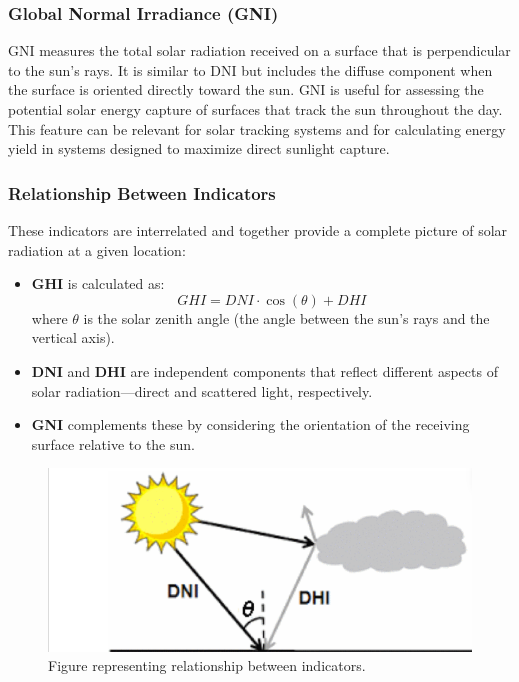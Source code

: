 \documentclass[10pt,twocolumn]{article}
\begin{document}
\subsubsection{Global Normal Irradiance (GNI)}
\begin{itemize}
     GNI measures the total solar radiation received on a surface that is perpendicular to the sun’s rays. It is similar to DNI but includes the diffuse component when the surface is oriented directly toward the sun. GNI is useful for assessing the potential solar energy capture of surfaces that track the sun throughout the day. This feature can be relevant for solar tracking systems and for calculating energy yield in systems designed to maximize direct sunlight capture\cite{17}.
\end{itemize}

\subsubsection{Relationship Between Indicators}

These indicators are interrelated and together provide a complete picture of solar radiation at a given location:
\begin{itemize}
    \item \textbf{GHI} is calculated as:
    \[
    GHI = DNI \cdot \cos(\theta) + DHI
    \]
    where \( \theta \) is the solar zenith angle (the angle between the sun's rays and the vertical axis).
    \item \textbf{DNI} and \textbf{DHI} are independent components that reflect different aspects of solar radiation—direct and scattered light, respectively.
    \item \textbf{GNI} complements these by considering the orientation of the receiving surface relative to the sun.
\end{itemize}
\begin{figure}
    \centering
    \includegraphics[width=1\linewidth]{GHI.png}
    \caption{Figure representing relationship between indicators.\cite{17}}
    \label{Figure 1}
\end{figure}
\end{document}
